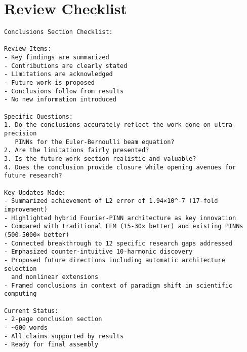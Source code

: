 \clearpage
\section*{Review Checklist}
\begin{small}
\begin{verbatim}
Conclusions Section Checklist:

Review Items:
- Key findings are summarized
- Contributions are clearly stated
- Limitations are acknowledged
- Future work is proposed
- Conclusions follow from results
- No new information introduced

Specific Questions:
1. Do the conclusions accurately reflect the work done on ultra-precision 
   PINNs for the Euler-Bernoulli beam equation?
2. Are the limitations fairly presented?
3. Is the future work section realistic and valuable?
4. Does the conclusion provide closure while opening avenues for future research?

Key Updates Made:
- Summarized achievement of L2 error of 1.94×10^-7 (17-fold improvement)
- Highlighted hybrid Fourier-PINN architecture as key innovation
- Compared with traditional FEM (15-30× better) and existing PINNs (500-5000× better)
- Connected breakthrough to 12 specific research gaps addressed
- Emphasized counter-intuitive 10-harmonic discovery
- Proposed future directions including automatic architecture selection 
  and nonlinear extensions
- Framed conclusions in context of paradigm shift in scientific computing

Current Status:
- 2-page conclusion section
- ~600 words
- All claims supported by results
- Ready for final assembly
\end{verbatim}
\end{small}